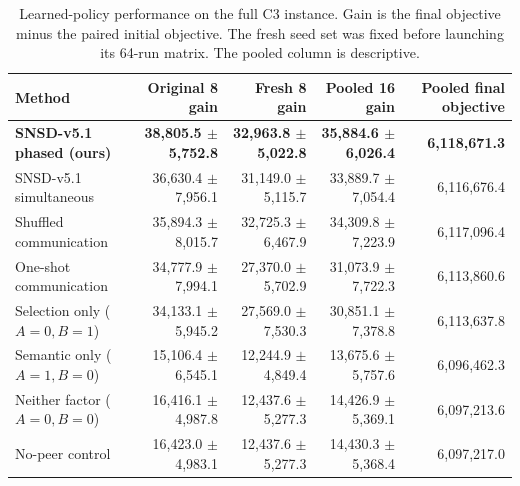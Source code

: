 
\begin{table}[t]
  \caption{Learned-policy performance on the full C3 instance. Gain is the final
  objective minus the paired initial objective. The fresh seed set was fixed
  before launching its 64-run matrix. The pooled column is descriptive.}
  \label{tab:v51-learned-main}
  \centering
  \scriptsize
  \begin{tabular}{lrrrr}
    \toprule
    Method & Original 8 gain & Fresh 8 gain & Pooled 16 gain & Pooled final objective \\
    \midrule
    \textbf{SNSD-v5.1 phased (ours)} & \textbf{38,805.5 $\pm$ 5,752.8} & \textbf{32,963.8 $\pm$ 5,022.8} & \textbf{35,884.6 $\pm$ 6,026.4} & \textbf{6,118,671.3} \\
    SNSD-v5.1 simultaneous & 36,630.4 $\pm$ 7,956.1 & 31,149.0 $\pm$ 5,115.7 & 33,889.7 $\pm$ 7,054.4 & 6,116,676.4 \\
    Shuffled communication & 35,894.3 $\pm$ 8,015.7 & 32,725.3 $\pm$ 6,467.9 & 34,309.8 $\pm$ 7,223.9 & 6,117,096.4 \\
    One-shot communication & 34,777.9 $\pm$ 7,994.1 & 27,370.0 $\pm$ 5,702.9 & 31,073.9 $\pm$ 7,722.3 & 6,113,860.6 \\
    Selection only ($A{=}0,B{=}1$) & 34,133.1 $\pm$ 5,945.2 & 27,569.0 $\pm$ 7,530.3 & 30,851.1 $\pm$ 7,378.8 & 6,113,637.8 \\
    Semantic only ($A{=}1,B{=}0$) & 15,106.4 $\pm$ 6,545.1 & 12,244.9 $\pm$ 4,849.4 & 13,675.6 $\pm$ 5,757.6 & 6,096,462.3 \\
    Neither factor ($A{=}0,B{=}0$) & 16,416.1 $\pm$ 4,987.8 & 12,437.6 $\pm$ 5,277.3 & 14,426.9 $\pm$ 5,369.1 & 6,097,213.6 \\
    No-peer control & 16,423.0 $\pm$ 4,983.1 & 12,437.6 $\pm$ 5,277.3 & 14,430.3 $\pm$ 5,368.4 & 6,097,217.0 \\
    \bottomrule
  \end{tabular}
\end{table}

